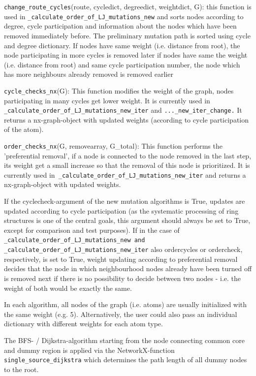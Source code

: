 \texttt{change\_route\_cycles}(route, cycledict, degreedict, weightdict,
G): this function is used in \texttt{\_calculate\_order\_of\_LJ\_mutations\_new}
and sorts nodes according to degree, cycle participation and information
about the nodes which have been removed immediately before. The preliminary mutation
path is sorted using cycle and degree dictionary. If nodes have same
weight (i.e. distance from root), the node participating in more cycles
is removed later if nodes have same the weight (i.e. distance from root)
and same cycle participation number, the node which has more neighbours
already removed is removed earlier

\texttt{cycle\_checks\_nx}(G): This function modifies the weight of
the graph, nodes participating in many cycles get lower weight. It
is currently used in \texttt{\_calculate\_order\_of\_LJ\_mutations\_new\_iter}
and \texttt{...\_new\_iter\_change.} It returns a nx-graph-object
with updated weights (according to cycle participation of the atom).

\texttt{order\_checks\_nx}(G, removearray, G\_total): This function
performs the 'preferential removal', if a node is connected to the
node removed in the last step, its weight get a small increase so
that the removal of this node is prioritized. It is currently used
in\texttt{ \_calculate\_order\_of\_LJ\_mutations\_new\_iter} and returns
a nx-graph-object with updated weights.

If the cyclecheck-argument of the new mutation algorithms is True,
updates are updated according to cycle participation (as the systematic
processing of ring structures is one of the central goals, this argument
should always be set to True, except for comparison and test purposes).
If in the case of \texttt{\_calculate\_order\_of\_LJ\_mutations\_new
and \_calculate\_order\_of\_LJ\_mutations\_new\_iter} also ordercycles
or ordercheck, respectively, is set to True, weight updating according
to preferential removal decides that the node in which neighbourhood
nodes already have been turned off is removed next if there is no
possibility to decide between two nodes - i.e. the weight of both
would be exactly the same.

In each algorithm, all nodes of the graph (i.e. atoms) are usually
initialized with the same weight (e.g. 5). Alternatively, the user
could also pass an individual dictionary with different weights for
each atom type.

The BFS- / Dijkstra-algorithm starting from the node connecting common
core and dummy region is applied via the NetworkX-function \texttt{single\_source\_dijkstra}
which determines the path length of all dummy nodes to the root.


